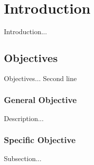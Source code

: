 \chapter{Introduction}

Introduction...

\section{Objectives}

Objectives...
Second line

\subsection{General Objective}

Description...

\subsection{Specific Objective}

Subsection...